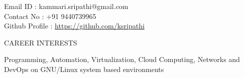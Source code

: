 \documentclass{resume} %
\newcommand{\blank}[1]{\hspace*{#1}}
\begin{document}
\blank{5 cm}
{Email ID : }
kammari.sripathi@gmail.com \\
\blank{5 cm}
{Contact No : }
+91 9440739965 \\
\blank{5 cm}
{Github Profile : }
\url{https://github.com/ksripathi}
\sectionlineskip \\


\begin{rSection}{CAREER INTERESTS}
  
  { Programming, Automation, Virtualization, Cloud Computing,
    Networks and DevOps on GNU/Linux system based environments }


\end{rSection}

\end{document}
